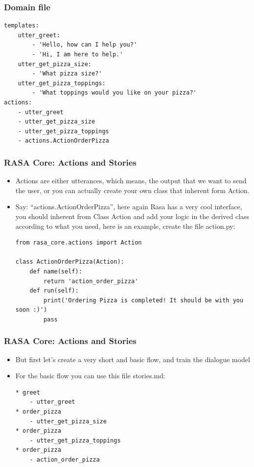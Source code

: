  \begin{frame}[fragile]\frametitle{Domain file}
\begin{lstlisting}
templates:
    utter_greet:
        - 'Hello, how can I help you?'
        - 'Hi, I am here to help.'
    utter_get_pizza_size:
        - 'What pizza size?'
    utter_get_pizza_toppings:
        - 'What toppings would you like on your pizza?'
actions:
    - utter_greet
    - utter_get_pizza_size
    - utter_get_pizza_toppings
    - actions.ActionOrderPizza
\end{lstlisting}
\end{frame}

 \begin{frame}[fragile]\frametitle{RASA Core: Actions and Stories}
\begin{itemize}
\item Actions are either utterances, which means, the output that we want to send the user, or you can actually create your own class that inherent form Action. 
\item Say: ``actions.ActionOrderPizza'', here again Rasa has a very cool interface, you should inherent from Class Action and add your logic in the derived class according to what you need, here is an example, create the file action.py:
\begin{lstlisting}
from rasa_core.actions import Action

class ActionOrderPizza(Action):
    def name(self):
        return 'action_order_pizza'
    def run(self):
        print('Ordering Pizza is completed! It should be with you soon :)')
        pass
\end{lstlisting}
		
\end{itemize}

\end{frame}

 \begin{frame}[fragile]\frametitle{RASA Core: Actions and Stories}
\begin{itemize}
\item But first let's create a very short and basic flow, and train the dialogue model
\item For the basic flow you can use this file stories.md:
\begin{lstlisting}
* greet
    - utter_greet
* order_pizza
    - utter_get_pizza_size
* order_pizza
    - utter_get_pizza_toppings
* order_pizza
    - action_order_pizza
\end{lstlisting}
		
\end{itemize}

\end{frame}

